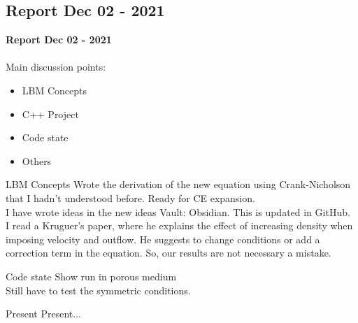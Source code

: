 \documentclass{beamer}
\begin{document}
	\subsection{Report Dec 02 - 2021}
	\justifying
	\begin{frame}
		\textbf{Report Dec 02 - 2021}\\~\\
		Main discussion points:
		\begin{itemize}
			\item LBM Concepts
			\item C++ Project
			\item Code state
			\item Others
		\end{itemize}
	\end{frame}
	\begin{frame}{LBM Concepts}
		Wrote the derivation of the new equation using Crank-Nicholson that I hadn't understood before. Ready for CE expansion.\\
		
		I have wrote ideas in the new ideas Vault: Obsidian. This is updated in GitHub.\\
		
		I read a Kruguer's paper, where he explains the effect of increasing density when imposing velocity and outflow. He suggests to change conditions or add a correction term in the equation. So, our results are not necessary a mistake.
	\end{frame}
	
	\begin{frame}{Code state}
		Show run in porous medium\\
		Still have to test the symmetric conditions. 
	\end{frame}
	
	
	\begin{frame}{Present}
		Present...
	\end{frame}
	
\end{document}
